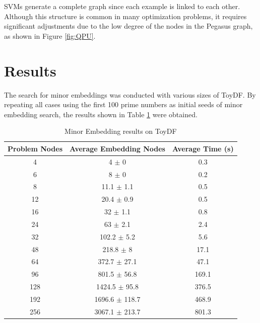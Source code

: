 SVMs generate a complete graph since each example is linked to each other. 
Although this structure is common in many optimization problems, it requires significant adjustments due to the low degree of the nodes in the Pegasus graph, as shown in Figure \ref{fig:QPU}.

\section{Results}\label{sec:qpu-res}

The search for minor embeddings was conducted with various sizes of ToyDF. 
By repeating all cases using the first 100 prime numbers as initial seeds of minor embedding search, the results shown in Table \ref{tab:scale} were obtained.

\begin{table}[H]
    \centering
    \begin{tabular}{ccc}
        \toprule
        Problem Nodes & Average Embedding Nodes & Average Time (s) \\
        \midrule
        \rowcolor{lightgray} 4 & 4 $\pm$ 0 & 0.3 \\
        6 & 8 $\pm$ 0 & 0.2 \\ 
        \rowcolor{lightgray} 8 & 11.1 $\pm$ 1.1 & 0.5 \\ 
        12 & 20.4 $\pm$ 0.9 & 0.5 \\ 
        \rowcolor{lightgray} 16 & 32 $\pm$ 1.1 & 0.8 \\ 
        24 & 63 $\pm$ 2.1 & 2.4 \\ 
        \rowcolor{lightgray} 32 & 102.2 $\pm$ 5.2 & 5.6 \\ 
        48 & 218.8 $\pm$ 8 & 17.1 \\ 
        \rowcolor{lightgray} 64 & 372.7 $\pm$ 27.1 & 47.1 \\ 
        96 & 801.5 $\pm$ 56.8 & 169.1 \\ 
        \rowcolor{lightgray} 128 & 1424.5 $\pm$ 95.8 & 376.5 \\ 
        192 & 1696.6 $\pm$ 118.7 & 468.9 \\ 
        \rowcolor{lightgray} 256 & 3067.1 $\pm$ 213.7 & 801.3 \\
        \bottomrule
    \end{tabular}
    \caption{Minor Embedding results on ToyDF}
    \label{tab:scale}
\end{table}

